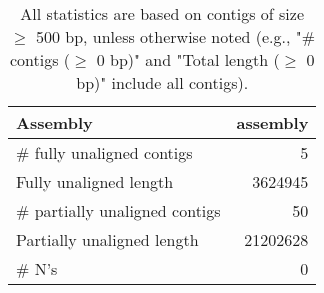 \documentclass[12pt,a4paper]{article}
\begin{document}
\begin{table}[ht]
\begin{center}
\caption{All statistics are based on contigs of size $\geq$ 500 bp, unless otherwise noted (e.g., "\# contigs ($\geq$ 0 bp)" and "Total length ($\geq$ 0 bp)" include all contigs).}
\begin{tabular}{|l*{1}{|r}|}
\hline
Assembly & assembly \\ \hline
\# fully unaligned contigs & 5 \\ \hline
Fully unaligned length & 3624945 \\ \hline
\# partially unaligned contigs & 50 \\ \hline
Partially unaligned length & 21202628 \\ \hline
\# N's & 0 \\ \hline
\end{tabular}
\end{center}
\end{table}
\end{document}
